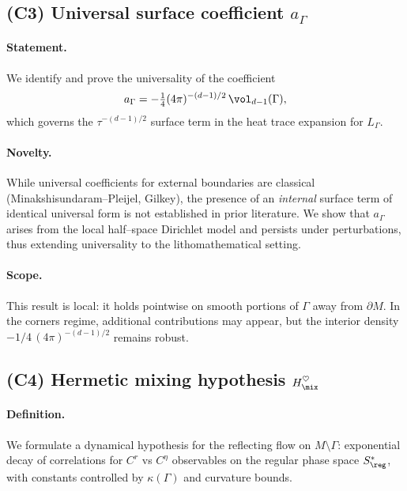 \subsection{(C3) Universal surface coefficient $a_\Gamma$}

\paragraph{Statement.}
We identify and prove the universality of the coefficient
\[
a_\Gamma = -\tfrac14 (4\pi)^{-(d-1)/2}\,\vol_{d-1}(\Gamma),
\]
which governs the $\tau^{-(d-1)/2}$ surface term in the heat trace expansion for $L_\Gamma$.

\paragraph{Novelty.}
While universal coefficients for external boundaries are classical (Minakshisundaram–Pleijel, Gilkey),
the presence of an \emph{internal} surface term of identical universal form 
is not established in prior literature. 
We show that $a_\Gamma$ arises from the local half–space Dirichlet model 
and persists under perturbations, thus extending universality to the lithomathematical setting.

\paragraph{Scope.}
This result is local: it holds pointwise on smooth portions of $\Gamma$ away from $\partial M$. 
In the corners regime, additional contributions may appear, 
but the interior density $-1/4\,(4\pi)^{-(d-1)/2}$ remains robust.

\subsection{(C4) Hermetic mixing hypothesis $H_{\mix}^\heartsuit$}

\paragraph{Definition.}
We formulate a dynamical hypothesis for the reflecting flow on $M\setminus\Gamma$:
exponential decay of correlations for $C^r$ vs $C^\eta$ observables on the regular phase space $S^*_{\reg}$, 
with constants controlled by $\kappa(\Gamma)$ and curvature bounds.

